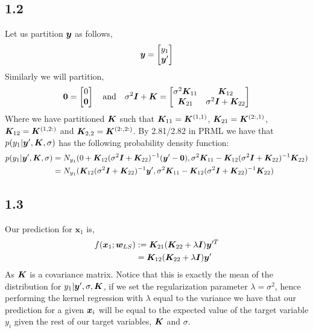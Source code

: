 \subsection*{1.2}
Let us partition ${\bm{y}}$ as follows,
\begin{equation}
    {\bm{y}} = \begin{bmatrix}
        y_{1} \\
        {\bm{y}}' 
      \end{bmatrix}
\end{equation} 
Similarly we will partition,
\begin{equation}
    \bm{0} = \begin{bmatrix}
        0 \\
        \bm{0} 
      \end{bmatrix}
      \quad \text{and} \quad 
      \sigma^{2} \bm{I} + {\bm{K}} = \begin{bmatrix}
        \sigma^{2} {\bm{K}}_{11} & {\bm{K}}_{12} \\
        {\bm{K}}_{21} & \sigma^{2} \bm{I} + {\bm{K}}_{22}
      \end{bmatrix}
\end{equation}
Where we have partitioned ${\bm{K}}$ such that ${\bm{K}}_{11}={\bm{K}}^{(1,1)}$, ${\bm{K}}_{21}={\bm{K}}^{(2:,1)}$, ${\bm{K}}_{12}= {\bm{K}}^{(1,2:)}$ and ${\bm{K}}_{2,2} = {\bm{K}}^{(2:,2:)}$. By 2.81/2.82 in PRML we have that $p(y_{1} | {\bm{y}}',{\bm{K}},\sigma)$ has the following probability density function:
\begin{align}
    p(y_{1} | {\bm{y}}',{\bm{K}},\sigma) &{} = N_{y_{1}}(0 + {\bm{K}}_{12}(\sigma^{2} \bm{I} + {\bm{K}}_{22})^{-1} ({\bm{y}}' - \bm{0}), \sigma^{2} {\bm{K}}_{11} - {\bm{K}}_{12} (\sigma^{2} \bm{I} + {\bm{K}}_{22})^{-1} {\bm{K}}_{22}) \\
    &= N_{y_{1}}( {\bm{K}}_{12}(\sigma^{2} \bm{I} + {\bm{K}}_{22})^{-1} {\bm{y}}' , \sigma^{2} {\bm{K}}_{11} - {\bm{K}}_{12} (\sigma^{2} \bm{I} + {\bm{K}}_{22})^{-1} {\bm{K}}_{22})
\end{align}

\subsection*{1.3}
Our prediction for $\bm{x}_{1}$ is,
\begin{align}
    f({\bm{x}}_{1} ; {\bm{w}_{LS}}) &{} := {\bm{K}}_{21} ({\bm{K}}_{22} + \lambda \bm{I}) {\bm{y}}'^{T} \\
    & = {\bm{K}}_{12} ({\bm{K}}_{22} + \lambda \bm{I}) {\bm{y}}'
\end{align}
As ${\bm{K}}$ is a covariance matrix. Notice that this is exactly the mean of the distribution for $y_{1} | {\bm{y}}' , \sigma, {\bm{K}}$, if we set the regularization parameter $\lambda=\sigma^{2}$, hence performing the kernel regression with $\lambda$ equal to the variance we have that our prediction for a given ${\bm{x}_{i}}$ will be equal to the expected value of the target variable $y_{i}$ given the rest of our target variables, ${\bm{K}}$ and $\sigma$. 


